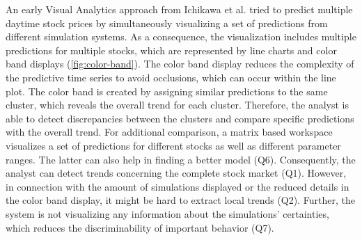 \documentclass[electronic]{vgtc}             %
\begin{document}
An early Visual Analytics approach from Ichikawa et al. \cite{ichikawa:2002} tried to predict multiple daytime stock prices by simultaneously visualizing a set of predictions from different simulation systems. 
As a consequence, the visualization includes multiple predictions for multiple stocks, which are represented by line charts and color band displays (\autoref{fig:color-band}).
The color band display reduces the complexity of the predictive time series to avoid occlusions, which can occur within the line plot. 
The color band is created by assigning similar predictions to the same cluster, which reveals the overall trend for each cluster.
Therefore, the analyst is able to detect discrepancies between the clusters and compare specific predictions with the overall trend. 
For additional comparison, a matrix based workspace visualizes a set of predictions for different stocks as well as different parameter ranges. 
The latter can also help in finding a better model (Q6).
Consequently, the analyst can detect trends concerning the complete stock market (Q1).  
However, in connection with the amount of simulations displayed or the reduced details in the color band display, it might be hard to extract local trends (Q2).
Further, the system is not visualizing any information about the simulations' certainties, which reduces the discriminability of important behavior (Q7). 
\end{document}
